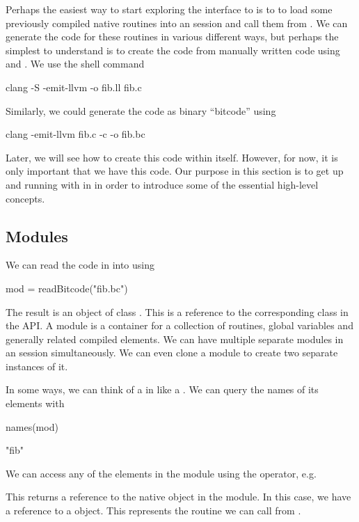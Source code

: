 Perhaps the easiest way to start exploring the \R{} interface to
\llvm{} is to to load some previously compiled native routines into an
\R{} session and call them from \R. 
We can generate the code for these routines in various different ways,
but perhaps the simplest to understand is to create the \IR{} code
from manually written \C{} code using \clang{} and
. We use the shell command
\begin{ShCode}
clang -S -emit-llvm -o fib.ll fib.c
\end{ShCode}
Similarly, we could generate the code as binary ``bitcode''
using
\begin{ShCode}
clang  -emit-llvm fib.c -c -o fib.bc
\end{ShCode}
Later, we will see how to create this code within \R{} itself.
However, for now, it is  only important that we have this code.
Our purpose in this section is to get up and running with \llvm{}
in \R{} in order to introduce some of the essential high-level concepts.


\subsection{Modules}
We can read the code in  into \R{} using
\begin{RCode}
mod = readBitcode("fib.bc")  
\end{RCode}
The result is an object of class .  This is a reference
to the corresponding \Cpp{} class in the \llvm{} API.  A module is a
container for a collection of routines, global variables and generally
related compiled elements.  We can have multiple separate modules in
an \R{} session simultaneously.  We can even clone a module to create
two separate instances of it.

In some ways, we can think of a  in \R{} like a .
We can query the names of its elements with 
\begin{RCode}
names(mod)
\end{RCode}
\begin{ROutput}
[1] "fib"  
\end{ROutput}

We can access any of the elements in the module using the
\Rdollar{} operator, e.g. 
This returns a reference to the native object in the \llvm{} module.
In this case, we have a reference to a  object.
This represents the routine we can call from \R.

